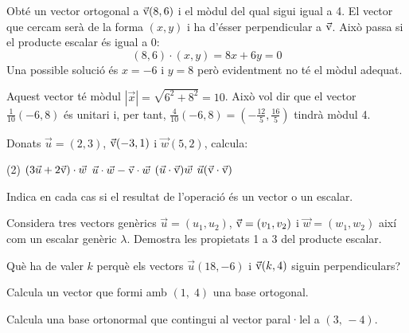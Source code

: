 \begin{resolt}[E]{Obté un vector ortogonal a $\vec{\mathrm{v}}(8,6)$ i el mòdul del qual sigui igual a 4.}
	El vector que cercam serà de la forma $(x,y)$ i ha d'ésser perpendicular a $\vec{\mathrm{v}}$. Això passa si el producte escalar és igual a 0:
	\begin{equation*}
	(8,6)\cdot(x,y)=8x+6y=0
	\end{equation*}
	Una possible solució és $x=-6$ i $y=8$ però evidentment no té el mòdul adequat. 
	
	Aquest vector té mòdul  $|\vec x|=\sqrt{6^2+8^2}=10$. Això vol dir que el vector $\frac{1}{10}(-6,8)$ és unitari i, per tant,  $\frac{4}{10}(-6,8)=(-\frac{12}{5}, \frac{16}{5})$ tindrà mòdul 4.
\end{resolt}

\begin{mylist}


	\exer Donats $\vec u =(2,3)$, $\vec{\mathrm{v}} (-3,1)$ i $\vec w(5,2)$, calcula:
	\begin{tasks}(2)
		\task $(3\vec u + 2 \vec{\mathrm{v}}) \cdot \vec w$
		\task $\vec u \cdot \vec w - \vec{\mathrm{v}} \cdot \vec w$
		\task $(\vec u \cdot \vec{\mathrm{v}})\vec w$
		\task $\vec u (\vec{\mathrm{v}}\cdot \vec{\mathrm{v}})$
	\end{tasks}
	Indica en cada cas si el resultat de l'operació és un vector o un escalar.
	
	\answers{[22 un escalar, $=(\vec u -\vec v)\cdot \vec w=29$ un escalar, $(-15,-6)$ un vector, $(20,30)$ un vector]}
	
	\exer  Considera tres vectors genèrics $\vec{u}=\left(u_{1} ,u_{2} \right)$, $\vec{\mathrm{v}}=\left(v_{1} ,v_{2} \right)$ i $\vec{w}=\left(w_{1} ,w_{2} \right)$ així com un escalar genèric $\lambda$. Demostra les propietats 1 a 3 del producte escalar.
	
	\exer Què ha de valer $k$ perquè els vectors $\vec u(18, -6)$ i $\vec{\mathrm{v}}(k, 4)$ siguin perpendiculars?
	
	
	\exer  Calcula un vector que formi amb $\left(1,\; 4\right)$ una base ortogonal.
	
	
	\exer[1]  Calcula una base ortonormal que contingui al vector paral·lel a $\left(3,\, -4\right)$.
	
\end{mylist}

\pagebreak
